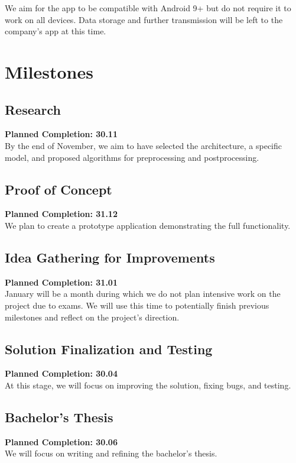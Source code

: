 \documentclass[12pt]{article}
\begin{document}
We aim for the app to be compatible with Android 9+ but do not require it to work on all devices. Data storage and further transmission will be left to the company's app at this time.

\section*{Milestones}

\subsection*{Research}
\textbf{Planned Completion: 30.11}\\
By the end of November, we aim to have selected the architecture, a specific model, and proposed algorithms for preprocessing and postprocessing.

\subsection*{Proof of Concept}
\textbf{Planned Completion: 31.12}\\
We plan to create a prototype application demonstrating the full functionality.

\subsection*{Idea Gathering for Improvements}
\textbf{Planned Completion: 31.01}\\
January will be a month during which we do not plan intensive work on the project due to exams. We will use this time to potentially finish previous milestones and reflect on the project's direction.

\subsection*{Solution Finalization and Testing}
\textbf{Planned Completion: 30.04}\\
At this stage, we will focus on improving the solution, fixing bugs, and testing.

\subsection*{Bachelor's Thesis}
\textbf{Planned Completion: 30.06}\\
We will focus on writing and refining the bachelor's thesis.




\end{document}

